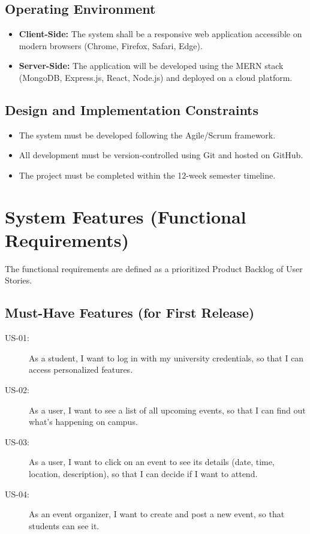 \documentclass[11pt, a4paper]{article}
\begin{document}
\subsection{Operating Environment}
\begin{itemize}
    \item \textbf{Client-Side:} The system shall be a responsive web application accessible on modern browsers (Chrome, Firefox, Safari, Edge).
    \item \textbf{Server-Side:} The application will be developed using the MERN stack (MongoDB, Express.js, React, Node.js) and deployed on a cloud platform.
\end{itemize}

\subsection{Design and Implementation Constraints}
\begin{itemize}
    \item The system must be developed following the Agile/Scrum framework.
    \item All development must be version-controlled using Git and hosted on GitHub.
    \item The project must be completed within the 12-week semester timeline.
\end{itemize}

\section{System Features (Functional Requirements)}
The functional requirements are defined as a prioritized Product Backlog of User Stories.

\subsection{Must-Have Features (for First Release)}
\begin{description}
    \item[US-01:] As a student, I want to log in with my university credentials, so that I can access personalized features.
    \item[US-02:] As a user, I want to see a list of all upcoming events, so that I can find out what's happening on campus.
    \item[US-03:] As a user, I want to click on an event to see its details (date, time, location, description), so that I can decide if I want to attend.
    \item[US-04:] As an event organizer, I want to create and post a new event, so that students can see it.
\end{description}
\end{document}
